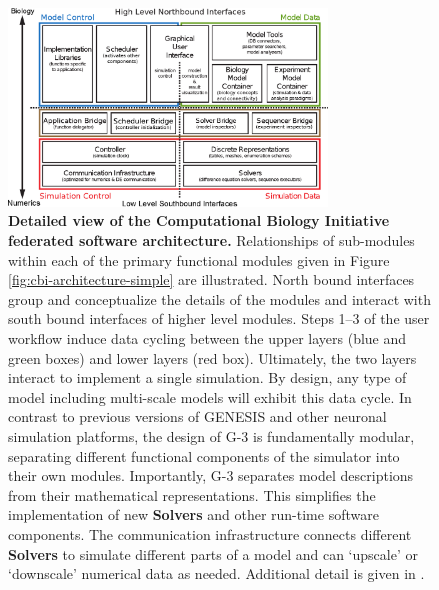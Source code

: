 \documentclass{article}
\begin{document}
\begin{figure}[h!t]
  \begin{center}
    \includegraphics[width=3.33in]{figures/cbi-architecture-expanded.eps}
  \end{center}
  \caption{ {\bf Detailed view of the Computational Biology Initiative
      federated software architecture.} Relationships of sub-modules
    within each of the primary functional modules given in Figure
    \ref{fig:cbi-architecture-simple} are illustrated.  North bound interfaces group
    and conceptualize the details of the modules and interact with
    south bound interfaces of higher level modules.  Steps 1--3 of the
    user workflow induce data cycling between the
    upper layers (blue and green boxes) and lower layers (red box).
    Ultimately, the two layers interact to implement a single simulation.
    By design, any type of model including multi-scale models will
    exhibit this data cycle. In contrast to previous versions of GENESIS and
    other neuronal simulation platforms, the design of G-3 is
    fundamentally modular, separating different functional components
    of the simulator into their own modules. Importantly, G-3
    separates model descriptions from their mathematical representations.  This simplifies the
    implementation of new {\bf Solvers} and other run-time software
    components. The communication infrastructure connects different
    {\bf Solvers} to simulate different parts of a model and can `upscale' or `downscale'
    numerical data as needed. Additional detail is given in \cite{10.1371/journal.pone.0028956}.}
  \label{fig:cbi-architecture-expanded}
\end{figure}
\end{document}
